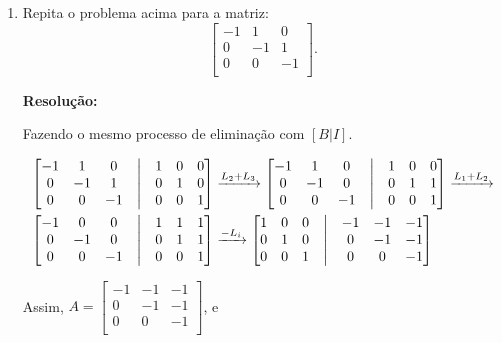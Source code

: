 \documentclass[leqno]{article}
\begin{document}
\begin{enumerate}
    \item Repita o problema acima para a matriz:
    $$\begin{bmatrix}
    -1 & 1 & 0\\
    0 & -1 & 1\\
    0 & 0 & -1\\
    \end{bmatrix}\text{.}$$
    
    \textbf{Resolução:}
    
    Fazendo o mesmo processo de eliminação com $[B|I]$.
    
    \begin{align*}
    \begin{bmatrix}
    -1 & 1 & 0 & \bigm| & 1 & 0 & 0\\
    0 & -1 & 1 & \bigm| & 0 & 1 & 0\\
    0 & 0 & -1 & \bigm| & 0 & 0 & 1\\
    \end{bmatrix}&\xrightarrow{L_2+L_3}\begin{bmatrix}
    -1 & 1 & 0 & \bigm| & 1 & 0 & 0\\
    0 & -1 & 0 & \bigm| & 0 & 1 & 1\\
    0 & 0 & -1 & \bigm| & 0 & 0 & 1\\
    \end{bmatrix}\xrightarrow{L_1+L_2}\\
    \begin{bmatrix}
    -1 & 0 & 0 & \bigm| & 1 & 1 & 1\\
    0 & -1 & 0 & \bigm| & 0 & 1 & 1\\
    0 & 0 & -1 & \bigm| & 0 & 0 & 1\\
    \end{bmatrix}&\xrightarrow{-L_i}\begin{bmatrix}
    1 & 0 & 0 & \bigm| & -1 & -1 & -1\\
    0 & 1 & 0 & \bigm| & 0 & -1 & -1\\
    0 & 0 & 1 & \bigm| & 0 & 0 & -1\\
    \end{bmatrix}\\
    \end{align*}
    
    Assim, $A=\begin{bmatrix}
    -1 & -1 & -1\\
    0 & -1 & -1\\
    0 & 0 & -1\\
    \end{bmatrix}$, e
    

\end{enumerate}
\end{document}
